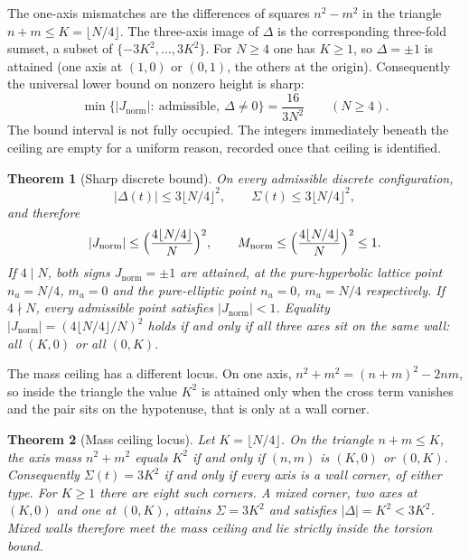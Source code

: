 \documentclass[a4paper]{article}
\newtheorem{theorem}{Theorem}[section]
\theoremstyle{definition}
\newcommand{\Jnorm}{J_{\mathrm{norm}}}
\newcommand{\Mnorm}{M_{\rm norm}}
\begin{document}
The one-axis mismatches are the differences of squares $n^2-m^2$ in the triangle $n+m\leq K=\lfloor N/4\rfloor$. The three-axis image of $\Delta$ is the corresponding three-fold sumset, a subset of $\{-3K^2,\ldots,3K^2\}$. For $N\geq 4$ one has $K\geq 1$, so $\Delta=\pm 1$ is attained (one axis at $(1,0)$ or $(0,1)$, the others at the origin). Consequently the universal lower bound on nonzero height is sharp:
\begin{equation}
\label{eq:gap}
\min\bigl\{|\Jnorm|:\ \text{admissible},\ \Delta\neq 0\bigr\}
=\frac{16}{3N^2}\qquad(N\geq 4).
\end{equation}
The bound interval is not fully occupied. The integers immediately beneath the ceiling are empty for a uniform reason, recorded once that ceiling is identified.

\begin{theorem}[Sharp discrete bound]
\label{thm:sharp}
On every admissible discrete configuration,
\[
\bigl|\Delta(t)\bigr|\leq 3\bigl\lfloor N/4\bigr\rfloor^2,\qquad
\Sigma(t)\leq 3\bigl\lfloor N/4\bigr\rfloor^2,
\]
and therefore
\[
|\Jnorm|\leq\Bigl(\frac{4\lfloor N/4\rfloor}{N}\Bigr)^2,\qquad
\Mnorm\leq\Bigl(\frac{4\lfloor N/4\rfloor}{N}\Bigr)^2\leq 1.
\]
If $4\mid N$, both signs $\Jnorm=\pm 1$ are attained, at the pure-hyperbolic lattice point $n_a=N/4$, $m_a=0$ and the pure-elliptic point $n_a=0$, $m_a=N/4$ respectively. If $4\nmid N$, every admissible point satisfies $|\Jnorm|<1$. Equality $|\Jnorm|=(4\lfloor N/4\rfloor/N)^2$ holds if and only if all three axes sit on the \emph{same} wall: all $(K,0)$ or all $(0,K)$.
\end{theorem}

The mass ceiling has a different locus. On one axis, $n^2+m^2=(n+m)^2-2nm$, so inside the triangle the value $K^2$ is attained only when the cross term vanishes and the pair sits on the hypotenuse, that is only at a wall corner.

\begin{theorem}[Mass ceiling locus]
\label{thm:mass-locus}
Let $K=\lfloor N/4\rfloor$. On the triangle $n+m\le K$, the axis mass $n^2+m^2$ equals $K^2$ if and only if $(n,m)$ is $(K,0)$ or $(0,K)$. Consequently $\Sigma(t)=3K^2$ if and only if every axis is a wall corner, of either type. For $K\ge 1$ there are eight such corners. A mixed corner, two axes at $(K,0)$ and one at $(0,K)$, attains $\Sigma=3K^2$ and satisfies $|\Delta|=K^2<3K^2$. Mixed walls therefore meet the mass ceiling and lie strictly inside the torsion bound.
\end{theorem}
\end{document}
